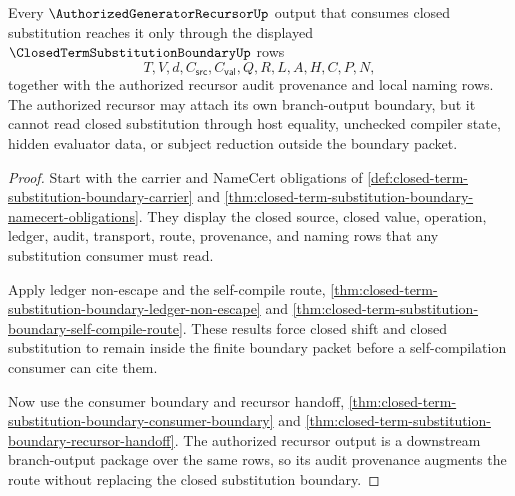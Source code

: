 \begin{theorem}
\label{thm:closed-term-substitution-boundary-authorized-recursor-audit-route}
Every $\AuthorizedGeneratorRecursorUp$ output that consumes closed substitution reaches it only through the displayed $\ClosedTermSubstitutionBoundaryUp$ rows
$$
T,V,d,C_{\mathsf{src}},C_{\mathsf{val}},Q,R,L,A,H,C,P,N,
$$
together with the authorized recursor audit provenance and local naming rows. The authorized recursor may attach its own branch-output boundary, but it cannot read closed substitution through host equality, unchecked compiler state, hidden evaluator data, or subject reduction outside the boundary packet.
\end{theorem}
\begin{proof}
Start with the carrier and NameCert obligations of \autoref{def:closed-term-substitution-boundary-carrier} and \autoref{thm:closed-term-substitution-boundary-namecert-obligations}. They display the closed source, closed value, operation, ledger, audit, transport, route, provenance, and naming rows that any substitution consumer must read.

Apply ledger non-escape and the self-compile route, \autoref{thm:closed-term-substitution-boundary-ledger-non-escape} and \autoref{thm:closed-term-substitution-boundary-self-compile-route}. These results force closed shift and closed substitution to remain inside the finite boundary packet before a self-compilation consumer can cite them.

Now use the consumer boundary and recursor handoff, \autoref{thm:closed-term-substitution-boundary-consumer-boundary} and \autoref{thm:closed-term-substitution-boundary-recursor-handoff}. The authorized recursor output is a downstream branch-output package over the same rows, so its audit provenance augments the route without replacing the closed substitution boundary.
\end{proof}

